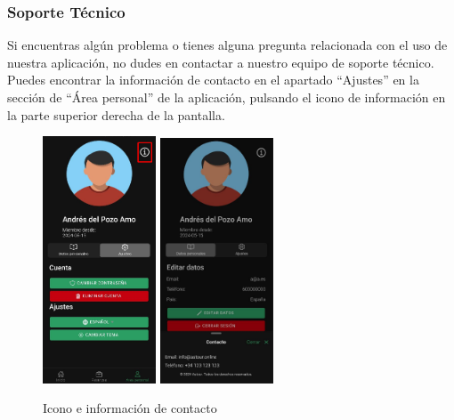 \subsubsection{Soporte Técnico}
Si encuentras algún problema o tienes alguna pregunta relacionada con el uso de nuestra aplicación, no dudes en contactar a nuestro equipo de soporte técnico.
Puedes encontrar la información de contacto en el apartado “Ajustes” en la sección de “Área personal” de la aplicación, pulsando el icono de información en la parte superior derecha de la pantalla.
\begin{figure}[H]
	\centering
	\includegraphics[width=0.3\textwidth]{7-Construccion/Manuales/app/P1-Info.png}
	\includegraphics[width=0.3\textwidth]{7-Construccion/Manuales/app/P2-Info.png}
	\caption{Icono e información de contacto}
\end{figure}

